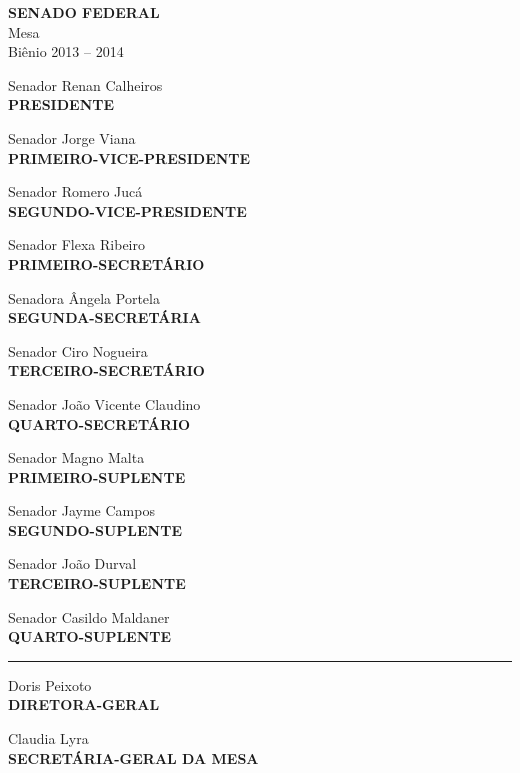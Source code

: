 \documentclass[a4paper,11pt,openright,twoside,brazil]{abntex2}
\begin{document}
\vspace*{\fill}
{
\centering
\setlength{\parindent}{0cm}
\setlength{\parskip}{0.5cm}  %

\ABNTEXchapterfont

{
\large
\textbf{SENADO FEDERAL}\\
Mesa\\
Biênio 2013 -- 2014\\
}

\vspace*{\parskip}
Senador Renan Calheiros\\
\textbf{PRESIDENTE}\\


\begin{multicols}{2}

Senador Jorge Viana\\
\textbf{PRIMEIRO-VICE-PRESIDENTE}

Senador Romero Jucá\\
\textbf{SEGUNDO-VICE-PRESIDENTE}

Senador Flexa Ribeiro\\
\textbf{PRIMEIRO-SECRETÁRIO}

\columnbreak

Senadora Ângela Portela\\
\textbf{SEGUNDA-SECRETÁRIA}

Senador Ciro Nogueira\\
\textbf{TERCEIRO-SECRETÁRIO}

Senador João Vicente Claudino\\
\textbf{QUARTO-SECRETÁRIO}

\end{multicols}

Senador Magno Malta\\
\textbf{PRIMEIRO-SUPLENTE}

Senador Jayme Campos\\
\textbf{SEGUNDO-SUPLENTE}

Senador João Durval\\
\textbf{TERCEIRO-SUPLENTE}

Senador Casildo Maldaner\\
\textbf{QUARTO-SUPLENTE}

\rule{5cm}{\ABNTEXsignthickness}%

Doris Peixoto\\
\textbf{DIRETORA-GERAL}

Claudia Lyra\\
\textbf{SECRETÁRIA-GERAL DA MESA}

}
\vspace*{\fill}


\end{document}
